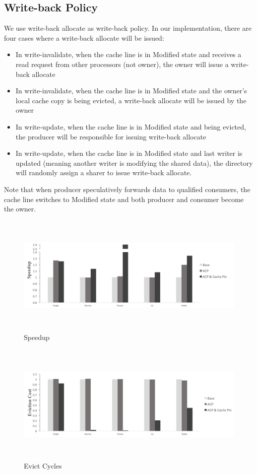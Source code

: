 \documentclass[conference]{IEEEtran}
\begin{document}
\subsection{Write-back Policy}
We use write-back allocate as write-back policy. In our implementation, there are four cases where a write-back allocate will be issued:
\begin{itemize}
  \item In write-invalidate, when the cache line is in Modified state and receives a read request from other processors (not owner), the owner will issue a write-back allocate
  \item In write-invalidate, when the cache line is in Modified state and the owner's local cache copy is being evicted, a write-back allocate will be issued by the owner
  \item In write-update, when the cache line is in Modified state and being evicted, the producer will be responsible for issuing write-back allocate
  \item In write-update, when the cache line is in Modified state and last writer is updated (meaning another writer is modifying the shared data), the directory will randomly assign a sharer to issue write-back allocate.
\end{itemize}
Note that when producer speculatively forwards data to qualified consumers, the cache line switches to Modified state and both producer and consumer become the owner.

\newpage

\begin{figure}[!h]
\centering
\hfil
\captionsetup{justification=centering}
\includegraphics[width=7.5in,height=2.3in]{speedup.png}
\caption{Speedup}
\label{speedup}
\end{figure}
\FloatBarrier

\begin{figure}[!h]
\centering
\captionsetup{justification=centering}
\includegraphics[width=7.5in,height=2.3in]{evict_cycles.png}
\caption{Evict Cycles}
\label{evict_cycles}
\end{figure}
\FloatBarrier
\end{document}
